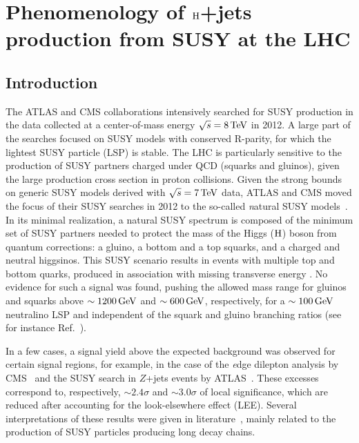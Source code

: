\chapter{Phenomenology of $\mathrm{H}$+jets production from SUSY at the LHC}
\label{ch:pheno}
\section{Introduction}
The ATLAS and CMS collaborations intensively searched for SUSY
production in the data collected at a center-of-mass energy
$\sqrt{s}=8 \,\text{Te\hspace{-.08em}V}$ in 2012. A large part of the searches focused on SUSY
models with conserved R-parity, for which the lightest SUSY particle
(LSP) is stable. The LHC is particularly sensitive to the production
of SUSY partners charged under QCD (squarks and gluinos), given the
large production cross section in proton collisions. Given the strong
bounds on generic SUSY models derived with $\sqrt{s}=7 \,\text{Te\hspace{-.08em}V}$ data,
ATLAS and CMS moved the focus of their SUSY searches in 2012 to the
so-called {\textit natural} SUSY models~\cite{naturalSUSY}. In its
minimal realization, a natural SUSY spectrum is composed of the
minimum set of SUSY partners needed to protect the mass of the Higgs
($\mathrm{H}$) boson from quantum corrections: a gluino, a bottom and a top
squarks, and a charged and neutral higgsinos. This SUSY scenario
results in events with multiple top and bottom quarks, produced in
association with missing transverse energy \met. No evidence for such
a signal was found, pushing the allowed mass range for gluinos and
squarks above $\sim 1200 \,\text{Ge\hspace{-.08em}V}$ and $\sim 600 \,\text{Ge\hspace{-.08em}V}$, respectively, for a
$\sim 100 \,\text{Ge\hspace{-.08em}V}$ neutralino LSP and independent of the squark and gluino branching ratios (see for instance Ref.~\cite{razor8TeVPRD}). 

In a few cases, a signal yield above the expected background was
observed for certain signal regions, for example, in the case of the
{\textit edge} dilepton analysis by CMS~\cite{CMSedge} and the SUSY
search in $Z$+jets events by ATLAS~\cite{ATLASZpeak}. These excesses
correspond to, respectively, $\sim 2.4\sigma$ and $\sim 3.0\sigma$ of
local significance, which are reduced after accounting for the
look-elsewhere effect (LEE). Several interpretations of these results
were given in
literature~\cite{Theory1,Theory2,Theory3,Theory4,Theory5,Theory6},
mainly related to the production of SUSY particles producing long
decay chains. 

